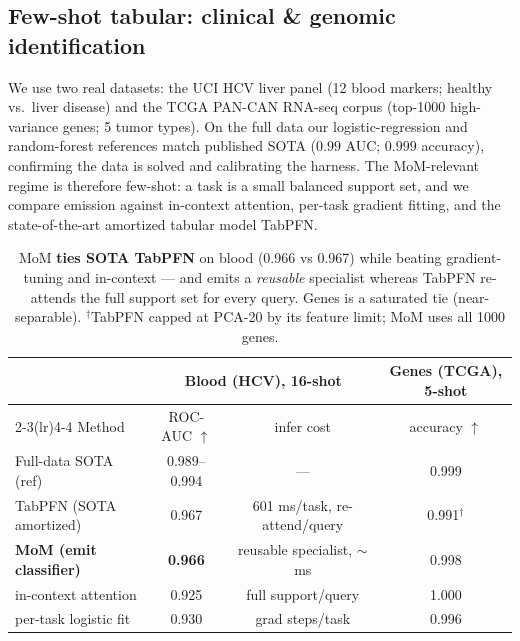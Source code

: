 \documentclass[11pt]{article}
\begin{document}
\subsection{Few-shot tabular: clinical \& genomic identification}
We use two real datasets: the UCI HCV liver panel (12 blood markers; healthy vs.\
liver disease) and the TCGA PAN-CAN RNA-seq corpus (top-1000 high-variance genes; 5
tumor types). On the full data our logistic-regression and random-forest references
match published SOTA ($0.99$ AUC; $0.999$ accuracy), confirming the data is solved
and calibrating the harness. The MoM-relevant regime is therefore few-shot: a task is
a small balanced support set, and we compare emission against in-context attention,
per-task gradient fitting, and the state-of-the-art amortized tabular model TabPFN.
\begin{table}[h]\centering\small
\begin{tabular}{lccc}
\toprule
& \multicolumn{2}{c}{Blood (HCV), 16-shot} & Genes (TCGA), 5-shot \\
\cmidrule(lr){2-3}\cmidrule(lr){4-4}
Method & ROC-AUC $\uparrow$ & infer cost & accuracy $\uparrow$ \\
\midrule
Full-data SOTA (ref) & 0.989--0.994 & --- & 0.999 \\
TabPFN (SOTA amortized) & 0.967 & 601 ms/task, re-attend/query & 0.991$^\dagger$ \\
\textbf{MoM (emit classifier)} & \textbf{0.966} & reusable specialist, $\sim$ms & 0.998 \\
in-context attention & 0.925 & full support/query & 1.000 \\
per-task logistic fit & 0.930 & grad steps/task & 0.996 \\
\bottomrule
\end{tabular}
\caption{MoM \textbf{ties SOTA TabPFN} on blood (0.966 vs 0.967) while beating
gradient-tuning and in-context --- and emits a \emph{reusable} specialist whereas
TabPFN re-attends the full support set for every query. Genes is a saturated tie
(near-separable). $^\dagger$TabPFN capped at PCA-20 by its feature limit; MoM uses
all 1000 genes.}
\end{table}
\end{document}
